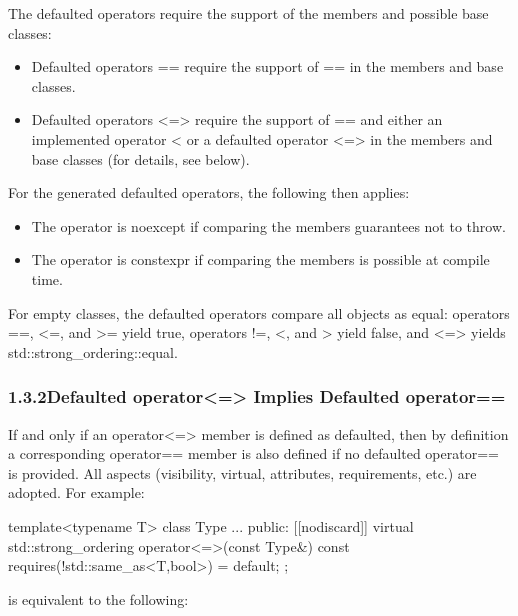 The defaulted operators require the support of the members and possible base classes:

\begin{itemize}
\item
Defaulted operators == require the support of == in the members and base classes.

\item
Defaulted operators <=> require the support of == and either an implemented operator < or a defaulted operator <=> in the members and base classes (for details, see below).
\end{itemize}

For the generated defaulted operators, the following then applies:

\begin{itemize}
\item
The operator is noexcept if comparing the members guarantees not to throw.

\item
The operator is constexpr if comparing the members is possible at compile time.
\end{itemize}

For empty classes, the defaulted operators compare all objects as equal: operators ==, <=, and >= yield true, operators !=, <, and > yield false, and <=> yields std::strong\_ordering::equal.


\subsubsection*{ 1.3.2\hspace{0.2cm}Defaulted operator<=> Implies Defaulted operator==}

If and only if an operator<=> member is defined as defaulted, then by definition a corresponding operator== member is also defined if no defaulted operator== is provided. All aspects (visibility, virtual, attributes, requirements, etc.) are adopted. For example:

\begin{cpp}
template<typename T>
class Type {
	...
	public:
		[[nodiscard]] virtual std::strong_ordering
			operator<=>(const Type&) const requires(!std::same_as<T,bool>) = default;
};
\end{cpp}

is equivalent to the following:

